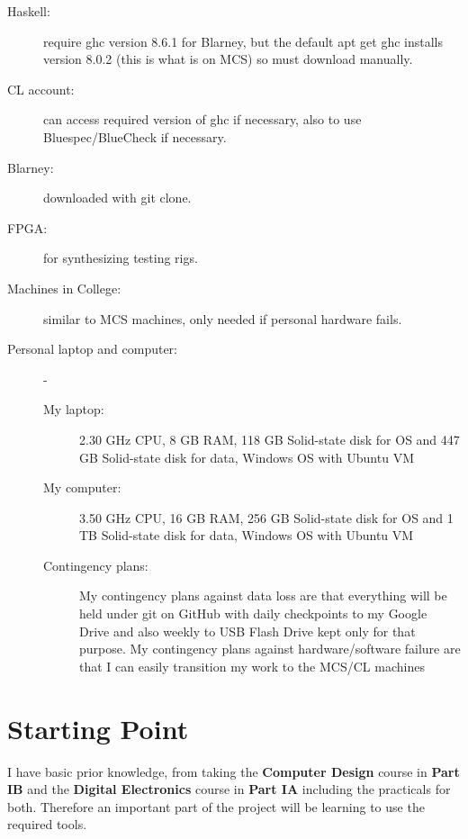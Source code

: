 \documentclass[UKenglish, 12pt]{article}
\begin{document}
\begin{description}

\item [Haskell:] require ghc version 8.6.1 for Blarney, but the default
apt get ghc installs version 8.0.2 (this is what is on MCS) so must
download manually.

\item [CL account:] can access required version of ghc if necessary, also to
use Bluespec/BlueCheck if necessary.

\item [Blarney:] downloaded with git clone.

\item [FPGA:] for synthesizing testing rigs.

\item [Machines in College:] similar to MCS machines, only needed if personal
hardware fails.

\item [Personal laptop and computer:]-

\begin{description}

\item [My laptop:] 2.30 GHz CPU, 8 GB RAM, 118 GB Solid-state disk for OS
and 447 GB Solid-state disk for data, Windows OS with Ubuntu VM

\item [My computer:] 3.50 GHz CPU, 16 GB RAM, 256 GB Solid-state disk for OS
and 1 TB Solid-state disk for data, Windows OS with Ubuntu VM

\item [Contingency plans:] My contingency plans against data loss are that everything
will be held under git on GitHub with daily checkpoints to
my Google Drive and also weekly to USB Flash Drive kept only for
that purpose.
My contingency plans against hardware/software failure are
that I can easily transition my work to the MCS/CL machines

\end{description}

\end{description}


\section*{Starting Point}

I have basic prior knowledge, from taking the \textbf{Computer Design} course in \textbf{Part IB} and the \textbf{Digital Electronics} course in \textbf{Part IA} including the practicals for both. Therefore an important part of the project will be learning to use the required tools.
\end{document}
